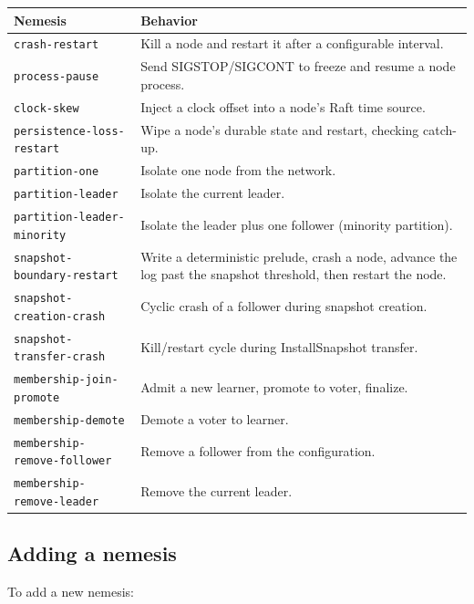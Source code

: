 \begin{longtable}{p{42mm}p{112mm}}
\toprule
Nemesis & Behavior \\
\midrule
\texttt{crash-restart} & Kill a node and restart it after a configurable interval. \\
\texttt{process-pause} & Send SIGSTOP/SIGCONT to freeze and resume a node process. \\
\texttt{clock-skew} & Inject a clock offset into a node's Raft time source. \\
\texttt{persistence-loss-restart} & Wipe a node's durable state and restart, checking catch-up. \\
\texttt{partition-one} & Isolate one node from the network. \\
\texttt{partition-leader} & Isolate the current leader. \\
\texttt{partition-leader-minority} & Isolate the leader plus one follower (minority partition). \\
\texttt{snapshot-boundary-restart} & Write a deterministic prelude, crash a node, advance the
log past the snapshot threshold, then restart the node. \\
\texttt{snapshot-creation-crash} & Cyclic crash of a follower during snapshot creation. \\
\texttt{snapshot-transfer-crash} & Kill/restart cycle during InstallSnapshot transfer. \\
\texttt{membership-join-promote} & Admit a new learner, promote to voter, finalize. \\
\texttt{membership-demote} & Demote a voter to learner. \\
\texttt{membership-remove-follower} & Remove a follower from the configuration. \\
\texttt{membership-remove-leader} & Remove the current leader. \\
\bottomrule
\end{longtable}

\subsection{Adding a nemesis}

To add a new nemesis:

